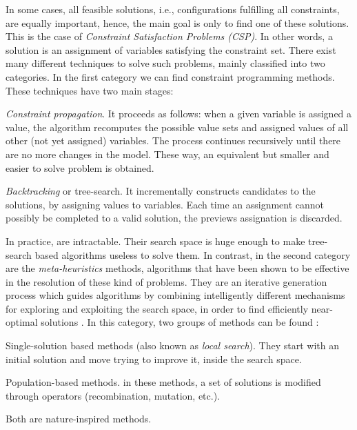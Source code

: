 In some cases, all feasible solutions, i.e., configurations fulfilling all constraints, are equally important, hence, the main goal is only to find  one of these solutions. This is the case of {\it Constraint Satisfaction Problems (CSP)}. In other words, a solution is an assignment of variables satisfying the constraint set. There exist many different techniques to solve such problems, mainly classified into two categories. In the first category we can find constraint programming methods. These techniques have two main stages: %
\begin{inparaenum}[a)] \item \textit{Constraint propagation}. It proceeds as follows: when a given variable is assigned a value, the algorithm recomputes the possible value sets and assigned values of all other (not yet assigned) variables. The process continues recursively until there are no more changes in the model. These way, an equivalent but smaller and easier to solve problem is obtained. \item \textit{Backtracking} or tree-search. It incrementally constructs candidates to the solutions, by assigning values to variables. Each time an assignment cannot possibly be completed to a valid solution, the previews assignation is discarded. \end{inparaenum} 

In practice, \CSPs{} are intractable. Their search space is huge enough to make tree-search based algorithms useless to solve them. In contrast, in the second category are the \textit{meta-heuristics} methods, algorithms that have been shown to be effective in the resolution of these kind of problems. They are an iterative generation process which guides algorithms by combining intelligently different mechanisms for exploring and exploiting the search space, in order to find efficiently near-optimal solutions \cite{Osman1996}. In this category, two groups of methods can be found \cite{Boussaid2013}: \begin{inparaenum}[a)] \item Single-solution based methods (also known as \textit{local search}). They start with an initial solution and move trying to improve it, inside the search space. \item Population-based methods. in these methods, a set of solutions is modified through operators (recombination, mutation, etc.). \end{inparaenum} Both are nature-inspired methods.


